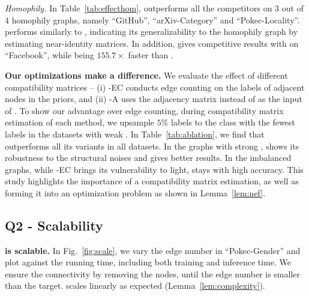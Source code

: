 

\textit{Homophily.}
In Table~\ref{tab:effecthom}, \methodhom outperforms all the competitors on $3$ out of $4$ homophily graphs, namely ``GitHub'', ``arXiv-Category'' and ``Pokec-Locality''. 
\method performs similarly to \methodhom, indicating its generalizability to the homophily graph by estimating near-identity matrices. 
In addition, \methodhom gives competitive results with \hols on ``Facebook'', while being $155.7\times$ faster than \hols.

\textbf{Our optimizations make a difference.}
We evaluate the effect of different compatibility matrices -- 
(i) \method-EC conducts edge counting on the labels of adjacent nodes in the priors, and
(ii) \method-A uses the adjacency matrix instead of \emphasis as the input of \methodest.
To show our advantage over edge counting, during compatibility matrix estimation of each method, we upsample $5\%$ labels to the class with the fewest labels in the datasets with weak \nef.
In Table~\ref{tab:ablation}, we find that \method outperforms all its variants in all datasets.
In the graphs with strong \nef, \method shows its robustness to the structural noises and gives better results.
In the imbalanced graphs, while \method-EC brings its vulnerability to light, \method stays with high accuracy.
This study highlights the importance of a compatibility matrix estimation, as well as forming it into an optimization problem as shown in Lemma~\ref{lem:nef}. 

\subsection{Q2 - Scalability}
\textbf{\method is scalable.}
In Fig.~\ref{fig:scale}, we vary the edge number in ``Pokec-Gender'' and plot against the running time, including both training and inference time.
We ensure the connectivity by removing the nodes, until the edge number is smaller than the target. 
\method scales linearly as expected (Lemma~\ref{lem:complexity}).

